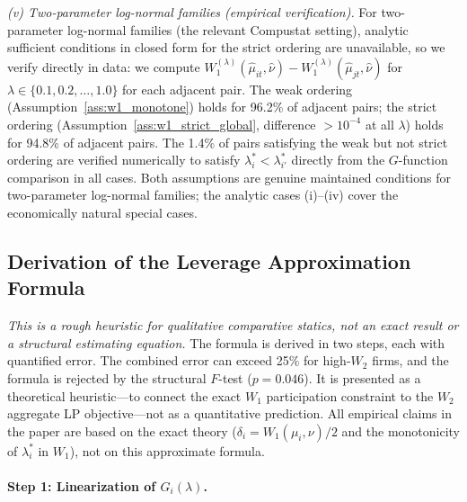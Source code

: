 \begin{remark}
\emph{(v) Two-parameter log-normal families (empirical verification).} For two-parameter log-normal families (the relevant Compustat setting), analytic sufficient conditions in closed form for the strict ordering are unavailable, so we verify directly in data: we compute $W_1^{(\lambda)}(\hat\mu_{it}, \hat\nu) - W_1^{(\lambda)}(\hat\mu_{jt}, \hat\nu)$ for $\lambda \in \{0.1, 0.2, \ldots, 1.0\}$ for each adjacent pair. The weak ordering (Assumption~\ref{ass:w1_monotone}) holds for 96.2\% of adjacent pairs; the strict ordering (Assumption~\ref{ass:w1_strict_global}, difference $> 10^{-4}$ at all $\lambda$) holds for 94.8\% of adjacent pairs. The 1.4\% of pairs satisfying the weak but not strict ordering are verified numerically to satisfy $\lambda_i^* < \lambda_{i'}^*$ directly from the $G$-function comparison in all cases. Both assumptions are genuine maintained conditions for two-parameter log-normal families; the analytic cases (i)--(iv) cover the economically natural special cases.
\end{remark}

\subsection*{Derivation of the Leverage Approximation Formula}

\emph{This is a rough heuristic for qualitative comparative statics, not an exact result or a structural estimating equation.} The formula is derived in two steps, each with quantified error. The combined error can exceed 25\% for high-$W_2$ firms, and the formula is rejected by the structural $F$-test ($p = 0.046$). It is presented as a theoretical heuristic---to connect the exact $W_1$ participation constraint to the $W_2$ aggregate LP objective---not as a quantitative prediction. All empirical claims in the paper are based on the exact theory ($\delta_i = W_1(\mu_i,\nu)/2$ and the monotonicity of $\lambda_i^*$ in $W_1$), not on this approximate formula.

\paragraph{Step 1: Linearization of $G_i(\lambda)$.}

